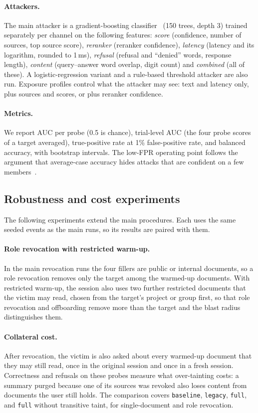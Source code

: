 \paragraph{Attackers.}
The main attacker is a gradient-boosting classifier~\cite{friedman2001gradient} (150 trees, depth 3) trained separately per channel on the following features: \emph{score} (confidence, number of sources, top source score), \emph{reranker} (reranker confidence), \emph{latency} (latency and its logarithm, rounded to 1\,ms), \emph{refusal} (refusal and ``denied'' words, response length), \emph{content} (query--answer word overlap, digit count) and \emph{combined} (all of these). A logistic-regression variant and a rule-based threshold attacker are also run. Exposure profiles control what the attacker may see: text and latency only, plus sources and scores, or plus reranker confidence.

\paragraph{Metrics.}
We report AUC per probe (0.5 is chance), trial-level AUC (the four probe scores of a target averaged), true-positive rate at 1\% false-positive rate, and balanced accuracy, with bootstrap intervals. The low-FPR operating point follows the argument that average-case accuracy hides attacks that are confident on a few members~\cite{carlini2022mia}.

\subsection{Robustness and cost experiments}
\label{sec:method-review}
The following experiments extend the main procedures. Each uses the same seeded events as the main runs, so its results are paired with them.

\paragraph{Role revocation with restricted warm-up.}
In the main revocation runs the four fillers are public or internal documents, so a role revocation removes only the target among the warmed-up documents. With restricted warm-up, the session also uses two further restricted documents that the victim may read, chosen from the target's project or group first, so that role revocation and offboarding remove more than the target and the blast radius distinguishes them.

\paragraph{Collateral cost.}
After revocation, the victim is also asked about every warmed-up document that they may still read, once in the original session and once in a fresh session. Correctness and refusals on these probes measure what over-tainting costs: a summary purged because one of its sources was revoked also loses content from documents the user still holds. The comparison covers \texttt{baseline}, \texttt{legacy}, \texttt{full}, and \texttt{full} without transitive taint, for single-document and role revocation.

